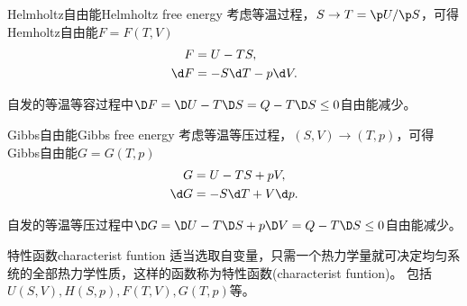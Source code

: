\begin{definition}
	{Helmholtz自由能}{Helmholtz free energy}
	考虑等温过程，$S\to T=\p U/\p S$，可得Hemholtz自由能$F=F(T,V)$
	\begin{subequations}
		\begin{align}
			F&=U-TS,\\
			\d F&=-S\d T-p\d V.
		\end{align}
	\end{subequations}
\end{definition}

\begin{corollary}
	自发的等温等容过程中$\D F=\D U-T\D S=Q-T\D S\leq 0$自由能减少。
\end{corollary}

\begin{definition}
	{Gibbs自由能}{Gibbs free energy}
	考虑等温等压过程，$(S,V)\to(T,p)$，可得Gibbs自由能$G=G(T,p)$
	\begin{subequations}
		\begin{align}
			G&=U-TS+pV,\\
			\d G&=-S\d T+V\d p.
		\end{align}
	\end{subequations}
\end{definition}

\begin{corollary}
	自发的等温等压过程中$\D G=\D U-T\D S+p\D V=Q-T\D S\leq 0$自由能减少。
\end{corollary}

\begin{definition}{特性函数}{characterist funtion}
	适当选取自变量，只需一个热力学量就可决定均匀系统的全部热力学性质，这样的函数称为特性函数(characterist funtion)。
	包括$U(S,V),H(S,p),F(T,V),G(T,p)$等。
\end{definition}

